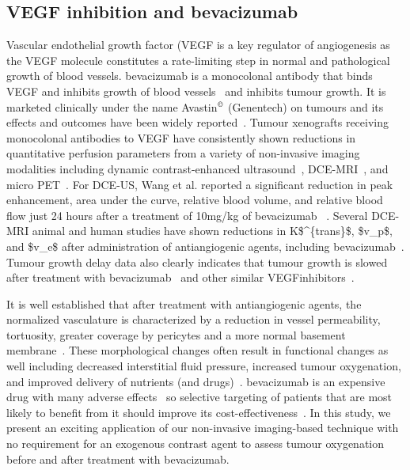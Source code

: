 \subsection{VEGF inhibition and bevacizumab}

Vascular endothelial growth factor (\acs{VEGF} is a key regulator of angiogenesis as the \acs{VEGF} molecule constitutes a rate-limiting step in normal and pathological growth of blood vessels.
bevacizumab is a monocolonal antibody that binds \acs{VEGF} and inhibits growth of blood vessels~\cite{Ferrara:2004fa} and inhibits tumour growth.
It is marketed clinically under the name Avastin$^{\tiny{\textrm{\textcopyright}}}$ (Genentech) on tumours and its effects and outcomes have been widely reported~\cite{Keating:2014gt, Pavlidis:2013bj, Barnett:2013bt, Kumler:2014gb}.
Tumour xenografts receiving monocolonal antibodies to VEGF have consistently shown reductions in quantitative perfusion parameters from a variety of non-invasive imaging modalities including dynamic contrast-enhanced ultrasound~\cite{Wang:2015bb}, \acs{DCE-MRI}~\cite{OConnor:2009cg}, and micro PET~\cite{Nagengast:2007hx}.
For \acs{DCE-US}, Wang et al. reported a significant reduction in peak enhancement, area under the curve, relative blood volume, and relative blood flow just 24 hours after a treatment of 10mg/kg of bevacizumab~\cite{Wang:2015bb} .  
Several DCE-MRI animal and human studies have shown reductions in \acs{K$^{trans}$}, \acs{$v_p$}, and \acs{$v_e$} after administration of antiangiogenic agents, including bevacizumab~\cite{Yang:2018hz}.
Tumour growth delay data also clearly indicates that tumour growth is slowed after treatment with bevacizumab~\cite{Yang:2018hz} and other similar \acs{VEGF}inhibitors~\cite{OConnor:2012ie}.

It is well established that after treatment with antiangiogenic agents, the normalized vasculature is characterized by a reduction in vessel permeability, tortuosity, greater coverage by pericytes and a more normal basement membrane~\cite{Jain:2005gk}. 
These morphological changes often result in functional changes as well including decreased interstitial fluid pressure, increased tumour oxygenation, and improved delivery of nutrients (and drugs)~\cite{Jain:2005gk}.
bevacizumab is an expensive drug with many adverse effects~\cite{Keating:2014gt} so selective targeting of patients that are most likely to benefit from it should improve its cost-effectiveness~\cite{Barnett:2013bt}.
In this study, we present an exciting application of our non-invasive imaging-based technique with no requirement for an exogenous contrast agent to assess tumour oxygenation before and after treatment with bevacizumab.

